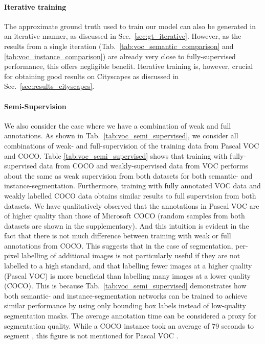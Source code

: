 \documentclass[runningheads]{llncs}
\begin{document}
\paragraph{Iterative training} The approximate ground truth used to train our model can also be generated in an iterative manner, as discussed in Sec.~\ref{sec:gt_iterative}.
However, as the results from a single iteration (Tab.~\ref{tab:voc_semantic_comparison} and \ref{tab:voc_instance_comparison}) are already very close to fully-supervised performance, this offers negligible benefit.
Iterative training is, however, crucial for obtaining good results on Cityscapes as discussed in Sec.~\ref{sec:results_cityscapes}.

\paragraph{Semi-Supervision}
We also consider the case where we have a combination of weak and full annotations.
As shown in Tab.~\ref{tab:voc_semi_supervised}, we consider all combinations of weak- and full-supervision of the training data from Pascal VOC and COCO.
Table \ref{tab:voc_semi_supervised} shows that training with fully-supervised data from COCO and weakly-supervised data from VOC performs about the same as weak supervision from both datasets for both semantic- and instance-segmentation.
Furthermore, training with fully annotated VOC data and weakly labelled COCO data obtains similar results to full supervision from both datasets.
We have qualitatively observed that the annotations in Pascal VOC are of higher quality than those of Microsoft COCO (random samples from both datasets are shown in the supplementary).
And this intuition is evident in the fact that there is not much difference between training with weak or full annotations from COCO.
This suggests that in the case of segmentation, per-pixel labelling of additional images is not particularly useful if they are not labelled to a high standard, and that labelling fewer images at a higher quality (Pascal VOC) is more beneficial than labelling many images at a lower quality (COCO).
This is because Tab.~\ref{tab:voc_semi_supervised} demonstrates how both semantic- and instance-segmentation networks can be trained to achieve similar performance by using only bounding box labels instead of low-quality segmentation masks.
The average annotation time can be considered a proxy for segmentation quality. 
While a COCO instance took an average of 79 seconds to segment \cite{lin_2014}, this figure is not mentioned for Pascal VOC \cite{everingham_2010,everingham_ijcv_2015}.
\end{document}
